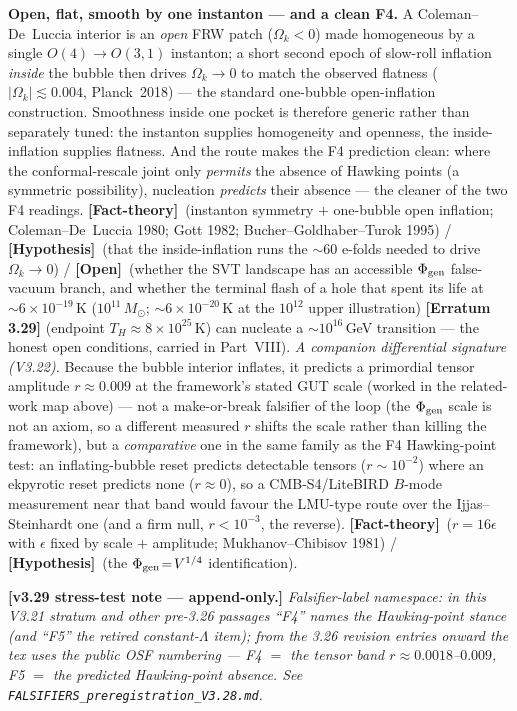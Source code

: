 \documentclass[11pt]{article}
\newcommand{\factth}{\textcolor{green!40!black}{\textbf{[Fact-theory]}}}
\newcommand{\hyp}{\textcolor{orange!80!black}{\textbf{[Hypothesis]}}}
\newcommand{\open}{\textcolor{red!70!black}{\textbf{[Open]}}}
\newcommand{\msun}{M_\odot}
\begin{document}
\medskip\noindent\textbf{Open, flat, smooth by one instanton --- and a clean F4.} A Coleman--De~Luccia interior is an \emph{open} FRW patch ($\Omega_k<0$) made homogeneous by a single $O(4)\!\to\!O(3,1)$ instanton; a short second epoch of slow-roll inflation \emph{inside} the bubble then drives $\Omega_k\!\to\!0$ to match the observed flatness ($|\Omega_k|\lesssim0.004$, Planck~2018) --- the standard one-bubble open-inflation construction. Smoothness inside one pocket is therefore generic rather than separately tuned: the instanton supplies homogeneity and openness, the inside-inflation supplies flatness. And the route makes the F4 prediction clean: where the conformal-rescale joint only \emph{permits} the absence of Hawking points (a symmetric possibility), nucleation \emph{predicts} their absence --- the cleaner of the two F4 readings. \factth\ (instanton symmetry $+$ one-bubble open inflation; Coleman--De~Luccia 1980; Gott 1982; Bucher--Goldhaber--Turok 1995) / \hyp\ (that the inside-inflation runs the $\sim$60 e-folds needed to drive $\Omega_k\!\to\!0$) / \open\ (whether the SVT landscape has an accessible $\Phi_{\rm gen}$ false-vacuum branch, and whether the terminal flash of a hole that spent its life at $\sim\!6\times10^{-19}$\,K ($10^{11}\,\msun$; $\sim\!6\times10^{-20}$\,K at the $10^{12}$ upper illustration) \textbf{[Erratum 3.29]} (endpoint $T_H\approx8\times10^{25}$\,K) can nucleate a $\sim\!10^{16}$\,GeV transition --- the honest open conditions, carried in Part~VIII). \emph{A companion differential signature (V3.22).} Because the bubble interior inflates, it predicts a primordial tensor amplitude $r\!\approx\!0.009$ at the framework's stated GUT scale (worked in the related-work map above) --- not a make-or-break falsifier of the loop (the $\Phi_{\rm gen}$ scale is not an axiom, so a different measured $r$ shifts the scale rather than killing the framework), but a \emph{comparative} one in the same family as the F4 Hawking-point test: an inflating-bubble reset predicts detectable tensors ($r\!\sim\!10^{-2}$) where an ekpyrotic reset predicts none ($r\!\approx\!0$), so a CMB-S4/LiteBIRD $B$-mode measurement near that band would favour the LMU-type route over the Ijjas--Steinhardt one (and a firm null, $r\!<\!10^{-3}$, the reverse). \factth\ ($r=16\epsilon$ with $\epsilon$ fixed by scale $+$ amplitude; Mukhanov--Chibisov 1981) / \hyp\ (the $\Phi_{\rm gen}\!=\!V^{1/4}$ identification).

\smallskip\noindent\textbf{[v3.29 stress-test note --- append-only.]} \emph{Falsifier-label namespace: in this V3.21 stratum and other pre-3.26 passages ``F4'' names the Hawking-point stance (and ``F5'' the retired constant-$\Lambda$ item); from the 3.26 revision entries onward the tex uses the public OSF numbering --- F4 $=$ the tensor band $r\approx0.0018$--$0.009$, F5 $=$ the predicted Hawking-point absence. See \texttt{FALSIFIERS\_preregistration\_V3.28.md}.}
\end{document}
